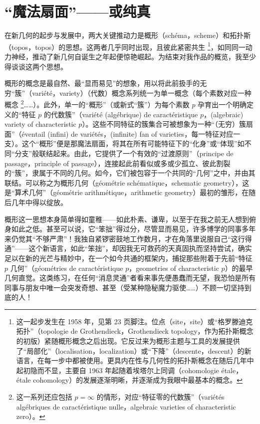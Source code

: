 \section{“魔法扇面”——或纯真}

在新几何的起步与发展中，两大关键推动力是概形（schéma，scheme）和拓扑斯（topos，topos）的思想。这两者几乎同时出现，且彼此紧密共生 \footnote{这一起步发生在 1958 年，见第 23 页脚注。位点（site，site）或“格罗滕迪克拓扑”（topologie de Grothendieck，Grothendieck topology，作为拓扑斯概念的初版）紧随概形概念之后出现。它反过来为概形主题与工具的发展提供了“局部化”（localisation，localization）或“下降”（descente，descent）的新语言，在每一步中都被使用。更具内在性与几何性的拓扑斯概念在随后几年中起初隐而不显，主要自 1963 年起随着埃塔尔上同调（cohomologie étale，étale cohomology）的发展逐渐明晰，并逐渐成为我眼中最基本的概念。}，如同同一动力神经，推动了新几何自诞生之年起便惊艳崛起。为结束对我作品的概览，我至少得谈谈这两个思想。

概形的概念是最自然、最“显而易见”的想象，用以将此前扱手的无穷“簇”（variété，variety）（代数）概念系列统一为单一概念（每个素数对应一种概念 \footnote{这一系列还应包括 $p=\infty$ 的情形，对应“特征零的代数簇”（variétés algébriques de caractéristique nulle，algebraic varieties of characteristic zero）。}……）。此外，单一的“概形”（或新式“簇”）为每个素数 $p$ 孕育出一个明确定义的“特征 $p$ 的代数簇”（variété (algébrique) de caractéristique $p$，(algebraic) variety of characteristic $p$）。这些不同特征的簇集合可被想象为一种“（无穷）簇扇面”（éventail (infini) de variétés，(infinite) fan of varieties，每一特征对应一支）。这个“概形”便是那魔法扇面，将其在所有可能特征下的“化身”或“体现”如不同“分支”般联结起来。由此，它提供了一个有效的“过渡原则”（principe de passage，principle of passage），连接起此前看似或多或少孤立、彼此割裂的“簇”，隶属于不同的几何。如今，它们被包容于一个共同的“几何”之中，并由其联结。可以称之为概形几何（géométrie schématique，schematic geometry），这是“算术几何”（géométrie arithmétique，arithmetic geometry）最初的雏形，在随后几年中得以绽放。

概形这一思想本身简单得如童稚——如此朴素、谦卑，以至于在我之前无人想到俯身如此之低。甚至可以说，它“笨拙”得过分，尽管显而易见，许多博学的同事多年来仍觉其“不够严肃”！我独自紧锣密鼓地工作数月，才在角落里说服自己“这行得通”——这个新语言，如此“笨拙”，却因我无可救药的天真固执而坚持尝试，确实足以在新的光芒与精妙中，在一个如今共通的框架内，捕捉那些附着于先前“特征 $p$ 几何”（géométries de caractéristique $p$，geometries of characteristic $p$）的最早几何直觉。这类练习，在任何“消息灵通”者看来事先便愚蠢而无望，我恐怕是所有同事与朋友中唯一会突发奇想、甚至（受某种隐秘魔力驱使……）不顾一切坚持到底的人！

